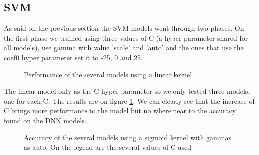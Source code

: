 \documentclass[journal, a4paper]{IEEEtran}
\begin{document}
    \subsection{SVM}
    As said on the previous section the SVM models went through two phases. On the first
phase we trained using three values of C (a hyper parameter shared for all models), use gamma
with value 'scale' and 'auto' and the ones that use the coef0 hyper parameter set it to
-25, 0 and 25.

    \begin{figure}
      \caption{Performance of the several models using a linear kernel}
      \label{fig:svm_linear}
    \end{figure}

    The linear model only as the C hyper parameter so we only tested three models, one
for each C. The results are on figure \ref{fig:svm_linear}. We can clearly see that the increase
of C brings more performance to the model but no where near to the accuracy found on the DNN models.

    \begin{figure}
      \caption{Accuracy of the several models using a sigmoid kernel with gammas as auto. On the legend
      are the several values of C used}
      \label{fig:svm_sigmoid_auto}
    \end{figure}
\end{document}
